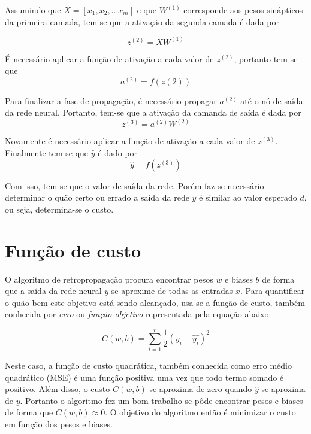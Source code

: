 Assumindo que $X = [x_1, x_2,...x_m]$ e que $W^{(1)}$ corresponde aos pesos sinápticos da primeira camada, tem-se que a ativação da segunda camada é dada por 

\begin{equation}
z^{(2)} = XW^{(1)}
\end{equation}

É necessário aplicar a função de ativação a cada valor de $z^{(2)}$, portanto tem-se que
\begin{equation}
a^{(2)} = f(z{(2)})
\end{equation}

Para finalizar a fase de propagação, é necessário propagar $a^{(2)}$ até o nó de saída da rede neural. Portanto, tem-se que a ativação da camanda de saída é dada por
\begin{equation}
z^{(3)} = a^{(2)}W^{(2)}
\end{equation}

Novamente é necessário aplicar a função de ativação a cada valor de $z^{(3)}$. Finalmente tem-se que $\hat{y}$ é dado por
\begin{equation}
\hat{y} = f(z^{(3)})
\end{equation}

Com isso, tem-se que o valor de saída da rede. Porém faz-se necessário determinar o quão certo ou errado a saída da rede $y$ é similar ao valor esperado $d$, ou seja, determina-se o custo.

\section{Função de custo}

O algoritmo de retropropagação procura encontrar pesos $w$ e biases $b$ de forma que a saída da rede neural $y$ se aproxime de todas as entradas $x$. Para quantificar o quão bem este objetivo está sendo alcançado, usa-se a função de custo, também conhecida por \textit{erro} ou \textit{função objetivo} representada pela equação abaixo:

\begin{equation}
\label{funcaodecusto}
C(w,b) = \sum_{i=1}^{r} \frac{1}{2}(y_i - \hat{y_i})^2    
\end{equation}

Neste caso, a função de custo quadrática, também conhecida como erro médio quadrático (MSE) é uma função positiva uma vez que todo termo somado é positivo. Além disso, o custo $C(w,b)$ se aproxima de zero quando $\hat{y}$ se aproxima de $y$. Portanto o algoritmo fez um bom trabalho se pôde encontrar pesos e biases de forma que $C(w,b) \approx 0$. O objetivo do algoritmo então é minimizar o custo em função dos pesos e biases.

